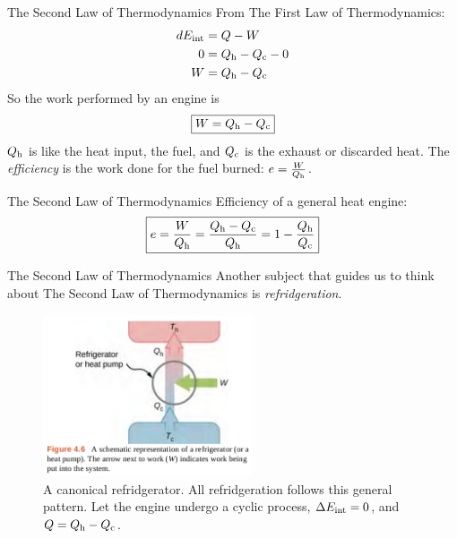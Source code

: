 \documentclass{beamer}
\begin{document}
\begin{frame}{The Second Law of Thermodynamics}
From The First Law of Thermodynamics:
\begin{align}
dE_{\rm int} &= Q - W \\
0 &= Q_{\rm h} - Q_{\rm c} - 0 \\
W &= Q_{\rm h} - Q_{\rm c}
\end{align}
So the work performed by an engine is
\begin{equation}
\boxed{W = Q_{\rm h} - Q_{\rm c}}
\end{equation}
$Q_{\rm h}$ is like the heat input, the fuel, and $Q_{\rm c}$ is the exhaust or discarded heat.  The \textit{efficiency} is the work done for the fuel burned: $e = \frac{W}{Q_{\rm h}}$.
\end{frame}

\begin{frame}{The Second Law of Thermodynamics}
Efficiency of a general heat engine:
\begin{equation}
\boxed{
e = \frac{W}{Q_{\rm h}} = \frac{Q_{\rm h}-Q_{\rm c}}{Q_{\rm h}} = 1-\frac{Q_{\rm h}}{Q_{\rm c}}
}
\end{equation}
\end{frame}

\begin{frame}{The Second Law of Thermodynamics}
Another subject that guides us to think about The Second Law of Thermodynamics is \textit{refridgeration}.
\begin{figure}
\centering
\includegraphics[width=0.55\textwidth]{figures/fridge.png}
\caption{\label{fig:fridge} A canonical refridgerator.  All refridgeration follows this general pattern.  Let the engine undergo a cyclic process, $\Delta E_{\rm int} = 0$, and $Q = Q_{\rm h} - Q_{\rm c}$.}
\end{figure}
\end{frame}
\end{document}
